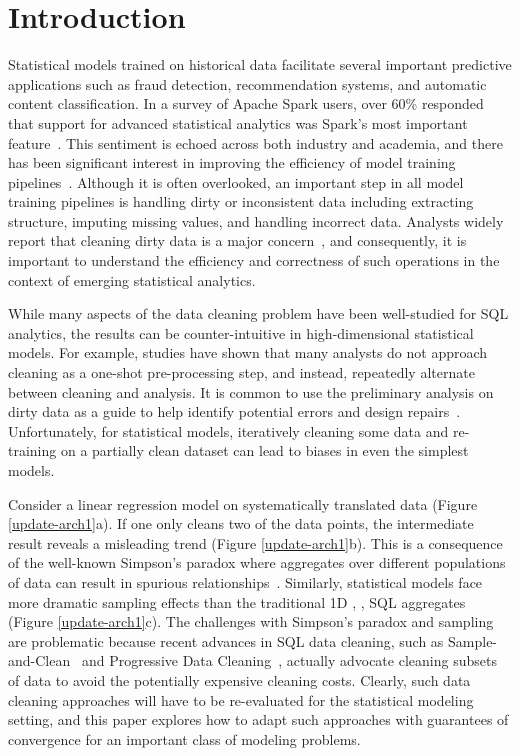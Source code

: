 \section{Introduction}\label{intro}
Statistical models trained on historical data facilitate several important predictive applications such as fraud detection, recommendation systems, and automatic content classification.
In a survey of Apache Spark users, over 60\% responded that support for advanced statistical analytics was Spark's most important feature~\cite{sparksurvey}.
This sentiment is echoed across both industry and academia, and there has been significant interest in improving the efficiency of model training pipelines~\cite{bdas, alexandrov2014stratosphere, crotty2014tupleware, tensor}. 
Although it is often overlooked, an important step in all model training pipelines is handling dirty or inconsistent data including extracting structure, imputing missing values, and handling incorrect data.
Analysts widely report that cleaning dirty data is a major concern~\cite{kandel2012,nytimes}, and consequently, it is important to understand the efficiency and correctness of such operations in the context of emerging statistical analytics.

While many aspects of the data cleaning problem have been well-studied for SQL analytics, the results can be counter-intuitive in high-dimensional statistical models.
For example, studies have shown that many analysts do not approach cleaning as a one-shot pre-processing step, and instead, repeatedly alternate between cleaning and analysis.
It is common to use the preliminary analysis on dirty data as a guide to help identify potential errors and design repairs~\cite{fayyad1996data, kandel2012,krishnan2016hilda}.
Unfortunately, for statistical models, iteratively cleaning some data and re-training on a partially clean dataset can lead to biases in even the simplest models.

Consider a linear regression model on systematically translated data (Figure \ref{update-arch1}a).
If one only cleans two of the data points, the intermediate result reveals a misleading trend (Figure \ref{update-arch1}b).
This is a consequence of the well-known Simpson's paradox where aggregates over different populations of data can result in spurious relationships~\cite{simpson1951interpretation}. 
Similarly, statistical models face more dramatic sampling effects than the traditional 1D  \sumfunc, \countfunc, \avgfunc SQL aggregates (Figure \ref{update-arch1}c).
The challenges with Simpson's paradox and sampling are problematic because recent advances in SQL data cleaning, such as Sample-and-Clean~\cite{wang1999sample} and Progressive Data Cleaning~\cite{altowim2014progressive, papenbrock2015progressive, DBLP:journals/pvldb/YakoutENOI11}, actually advocate cleaning subsets of data to avoid the potentially expensive cleaning costs.
Clearly, such data cleaning approaches will have to be re-evaluated for the statistical modeling setting, and this paper explores how to adapt such approaches with guarantees of convergence for an important class of modeling problems. 

